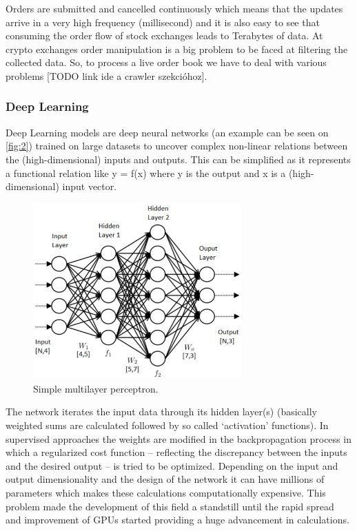 \documentclass[11pt,a4paper,oneside]{article}
\begin{document}
  Orders are submitted and cancelled continuously which means that the updates arrive in a very high frequency 
  (millisecond) and it is also easy to see that consuming the order flow of stock exchanges leads to Terabytes of data. 
  At crypto exchanges order manipulation is a big problem to be faced at filtering the collected data. So, to process a 
  live order book we have to deal with various problems [TODO link ide a crawler szekcióhoz].

  \subsubsection{Deep Learning}
  \label{sec:deep_learning}

  Deep Learning models are deep neural networks (an example can be seen on \autoref{fig:2}) trained on large datasets to 
  uncover complex non-linear relations between the (high-dimensional) inputs and outputs. This can be simplified as it 
  represents a functional relation like y = f(x) where y is the output and x is a (high-dimensional) input vector.

  \begin{figure}[tbh]
    \centering
    \includegraphics[width=8cm]{mlp.png}
    \caption{Simple multilayer perceptron.}
    \label{fig:2}
  \end{figure}

  The network iterates the input data through its hidden layer(s) (basically weighted sums are calculated followed by 
  so called ‘activation’ functions). In supervised approaches the weights are modified in the backpropagation process 
  in which a regularized cost function – reflecting the discrepancy between the inputs and the desired output – is tried 
  to be optimized. Depending on the input and output dimensionality and the design of the network it can have millions 
  of parameters which makes these calculations computationally expensive. This problem made the development of this 
  field a standstill until the rapid spread and improvement of GPUs started providing a huge advancement in 
  calculations.
\end{document}
